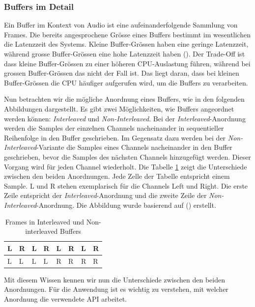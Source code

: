 \documentclass[11pt,a4paper]{article}
\begin{document}
\subsubsection{Buffers im Detail}
Ein Buffer im Kontext von Audio ist eine aufeinanderfolgende Sammlung von Frames. Die bereits
angesprochene Grösse eines Buffers bestimmt im wesentlichen die Latenzzeit des Systems. Kleine
Buffer-Grössen haben eine geringe Latenzzeit, während grosse Buffer-Grössen eine hohe Latenzzeit
haben (\cite[p.10]{somberg2019audioapi}). Der Trade-Off ist dass kleine Buffer-Grössen
zu einer höheren CPU-Auslastung führen, während bei grossen Buffer-Grössen das nicht der Fall ist.
Das liegt daran, dass bei kleinen Buffer-Grössen die CPU häufiger aufgerufen wird, um die Buffers
zu verarbeiten.

\noindent \newline
Nun betrachten wir die mögliche Anordnung eines Buffers, wie in den folgenden Abbildungen
dargestellt. Es gibt zwei Möglichkeiten, wie Buffers angeordnet werden
können: \textit{Interleaved} und \textit{Non-Interleaved}. Bei der \textit{Interleaved}-Anordnung
werden die Samples der einzelnen Channels nacheinander in sequentieller Reihenfolge in den Buffer
geschrieben. Im Gegensatz dazu werden bei der \textit{Non-Interleaved}-Variante die Samples
eines Channels nacheinander in den Buffer geschrieben, bevor die Samples des nächsten Channels
hinzugefügt werden. Dieser Vorgang wird für jeden Channel wiederholt. Die Tabelle
\ref{tab:frames_buffers} zeigt die Unterschiede zwischen den beiden Anordnungen. Jede Zelle der
Tabelle entspricht einem Sample. L und R stehen exemplarisch für die Channels Left und Right.
Die erste Zeile entspricht der \textit{Interleaved}-Anordnung und die zweite Zeile der
\textit{Non-Interleaved}-Anordnung. Die Abbildung wurde basierend auf
(\cite[p.11]{somberg2019audioapi}) erstellt.

\begin{table}[h]
	\centering
	\begin{tabularx}{\textwidth}{|X|X|X|X|X|X|X|X|}
		\hline
		L & R & L & R & L & R & L & R \\
		\hline
		L & L & L & L & R & R & R & R \\
		\hline
	\end{tabularx}
	\caption{Frames in Interleaved und Non-interleaved Buffers}
	\label{tab:frames_buffers}
\end{table}

\noindent
Mit diesem Wissen kennen wir nun die Unterschiede zwischen den beiden Anordnungen. Für die
Anwendung ist es wichtig zu verstehen, mit welcher Anordnung die verwendete API arbeitet.
\end{document}
